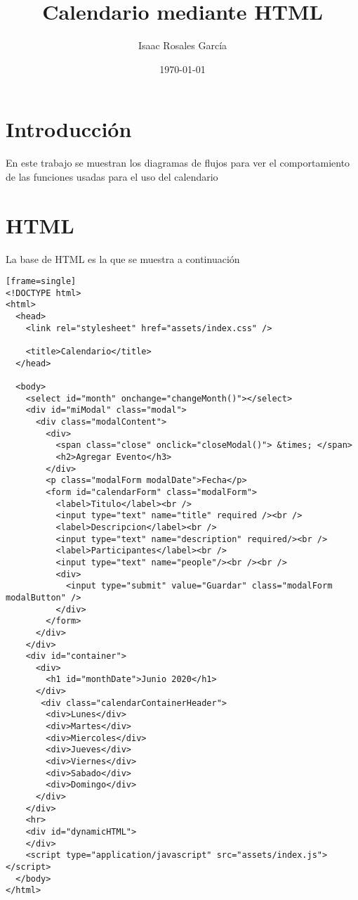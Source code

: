 \documentclass[12pt]{article}
\title{Calendario mediante HTML}
\author{Isaac Rosales García }
\date{\today}
\begin{document}
\maketitle
\tableofcontents

\section{Introducción}
En este trabajo se muestran los diagramas de flujos para ver el comportamiento de las funciones usadas para el uso del calendario

\section{HTML}
La base de HTML es la que se muestra a continuación

\begin{lstlisting}[style=htmlcssjs][frame=single]
<!DOCTYPE html>
<html>
  <head>
    <link rel="stylesheet" href="assets/index.css" />

    <title>Calendario</title>
  </head>

  <body>
    <select id="month" onchange="changeMonth()"></select>
    <div id="miModal" class="modal">
      <div class="modalContent">
        <div>
          <span class="close" onclick="closeModal()"> &times; </span>
          <h2>Agregar Evento</h3>
        </div>
        <p class="modalForm modalDate">Fecha</p>
        <form id="calendarForm" class="modalForm">
          <label>Titulo</label><br />
          <input type="text" name="title" required /><br />
          <label>Descripcion</label><br />
          <input type="text" name="description" required/><br />
          <label>Participantes</label><br />
          <input type="text" name="people"/><br /><br />
          <div>
            <input type="submit" value="Guardar" class="modalForm modalButton" />
          </div>
        </form>
      </div>
    </div>
    <div id="container">
      <div>
        <h1 id="monthDate">Junio 2020</h1>
      </div>
       <div class="calendarContainerHeader">
        <div>Lunes</div>
        <div>Martes</div>
        <div>Miercoles</div>
        <div>Jueves</div>
        <div>Viernes</div>
        <div>Sabado</div>
        <div>Domingo</div>
      </div>
    </div>
    <hr>
    <div id="dynamicHTML">
    </div>
    <script type="application/javascript" src="assets/index.js"></script>
  </body>
</html>
\end{lstlisting}
\end{document}
